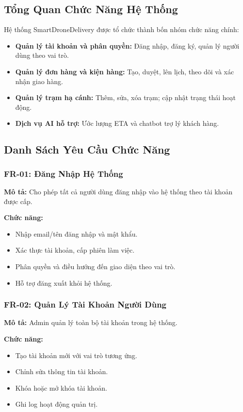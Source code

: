 \subsection{Tổng Quan Chức Năng Hệ Thống}

Hệ thống SmartDroneDelivery được tổ chức thành bốn nhóm chức năng chính:

\begin{itemize}
  \item \textbf{Quản lý tài khoản và phân quyền:} Đăng nhập, đăng ký, quản lý người dùng theo vai trò.
  \item \textbf{Quản lý đơn hàng và kiện hàng:} Tạo, duyệt, lên lịch, theo dõi và xác nhận giao hàng.
  \item \textbf{Quản lý trạm hạ cánh:} Thêm, sửa, xóa trạm; cập nhật trạng thái hoạt động.
  \item \textbf{Dịch vụ AI hỗ trợ:} Ước lượng ETA và chatbot trợ lý khách hàng.
\end{itemize}

\subsection{Danh Sách Yêu Cầu Chức Năng}

\subsubsection{FR-01: Đăng Nhập Hệ Thống}
\textbf{Mô tả:} Cho phép tất cả người dùng đăng nhập vào hệ thống theo tài khoản được cấp.

\textbf{Chức năng:}
\begin{itemize}
  \item Nhập email/tên đăng nhập và mật khẩu.
  \item Xác thực tài khoản, cấp phiên làm việc.
  \item Phân quyền và điều hướng đến giao diện theo vai trò.
  \item Hỗ trợ đăng xuất khỏi hệ thống.
\end{itemize}

\subsubsection{FR-02: Quản Lý Tài Khoản Người Dùng}
\textbf{Mô tả:} Admin quản lý toàn bộ tài khoản trong hệ thống.

\textbf{Chức năng:}
\begin{itemize}
  \item Tạo tài khoản mới với vai trò tương ứng.
  \item Chỉnh sửa thông tin tài khoản.
  \item Khóa hoặc mở khóa tài khoản.
  \item Ghi log hoạt động quản trị.
\end{itemize}

